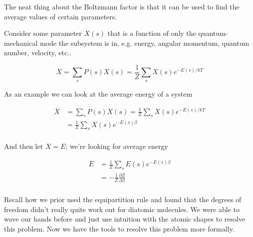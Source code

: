\documentclass[10pt]{article}
\begin{document}
The neat thing about the Boltzmann factor is that it can be used to find the average values of certain parameters.


\begin{theorem}
	Consider some parameter $ X(s) $  that is a function of only the quantum-mechanical mode the subsystem is in, e.g. energy, angular momentum, quantum number, velocity, etc..

	\begin{equation}
		\overline{X} = \sum_s P(s) X(s) = \frac{1}{Z} \sum_s X(s) e^{-E(s) /kT}
		\label{eq:294:boltzmann_factor_avg_value}
	\end{equation}
\end{theorem}

As an example we can look at the average energy of a system
\begin{example}

	\begin{equation}
		\begin{split}
			\overline{X} &= \sum_s P(s) X(s) = \frac{1}{Z} \sum_s X(s) e^{-E(s) /kT} \\
			&= \frac{1}{Z} \sum_s X(s) e^{-E(s)\beta} \\
		\end{split}
	\end{equation}

	And then let $ X = E $; we're looking for average energy

	
	\begin{equation}
		\begin{split}
			\overline{E} &= \frac{1}{Z} \sum_s E(s) e^{-E(s)\beta} \\
									 &= -\frac{1}{Z} \frac{\partial Z}{\partial \beta}  \\
		\end{split}
	\end{equation}
\end{example}

Recall how we prior used the equipartition rule and found that the degrees of freedom didn't really quite work out for diatomic molecules. 
We were able to wave our hands before and just use intuition with the atomic shapes to resolve this problem.
Now we have the tools to resolve this problem more formally.
\end{document}
